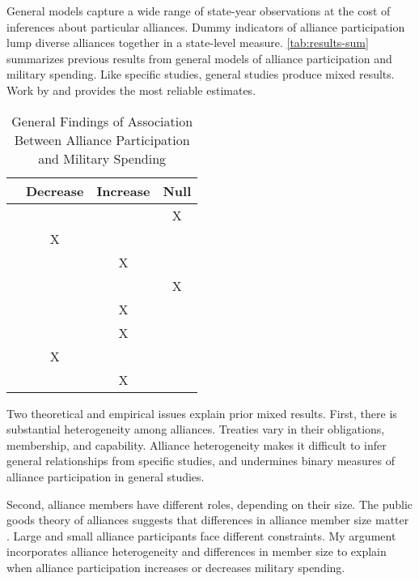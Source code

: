 \documentclass[12pt]{article}
\begin{document}
General models capture a wide range of state-year observations at the cost of inferences about particular alliances. 
Dummy indicators of alliance participation lump diverse alliances together in a state-level measure. 
\autoref{tab:results-sum} summarizes previous results from general models of alliance participation and military spending. 
Like specific studies, general studies produce mixed results. 
Work by \citet{DigiuseppePoast2016} and \citet{Horowitzetal2017} provides the most reliable estimates. 


\begin{table}[hbt!]
\begin{center}
\begin{tabular}{lccc}
     & Decrease & Increase & Null \\
\hline
\citet{MostSiverson1987} &  &  & X \\
\citet{Conybeare1994} & X & &  \\
\citet{Diehl1994} &  & X &  \\
\citet{Goldsmith2003} &  &  & X \\
\citet{MorganPalmer2006} &  & X & \\ 
\citet{QuirozFlores2011} &  & X &  \\ 
\citet{DigiuseppePoast2016} & X &  & \\ 
\citet{Horowitzetal2017} &  & X & \\ 
\hline
\end{tabular}
\caption{General Findings of Association Between Alliance Participation and Military Spending}
\label{tab:results-sum}
\end{center} 
\end{table}


Two theoretical and empirical issues explain prior mixed results.
First, there is substantial heterogeneity among alliances.
Treaties vary in their obligations, membership, and capability. 
Alliance heterogeneity makes it difficult to infer general relationships from specific studies, and undermines binary measures of alliance participation in general studies. 
 

Second, alliance members have different roles, depending on their size. 
The public goods theory of alliances suggests that differences in alliance member size matter \citep{OlsonZeckhauser1966, DudleyMontmarquette1981, Garfinkel2004}. 
Large and small alliance participants face different constraints. 
My argument incorporates alliance heterogeneity and differences in member size to explain when alliance participation increases or decreases military spending. 
\end{document}
